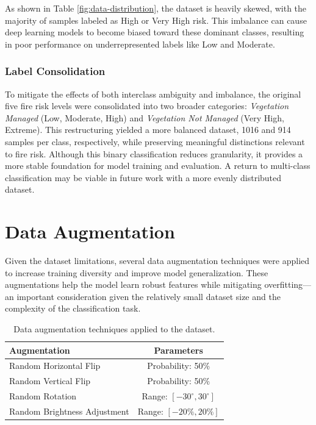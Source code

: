 As shown in Table \ref{fig:data-distribution}, the dataset is heavily skewed, 
with the majority of samples labeled as High or Very High risk. This imbalance 
can cause deep learning models to become biased toward these dominant classes, 
resulting in poor performance on underrepresented labels like Low and Moderate.

\subsubsection*{Label Consolidation}

To mitigate the effects of both interclass ambiguity and imbalance, the original 
five fire risk levels were consolidated into two broader categories: 
\textit{Vegetation Managed} (Low, Moderate, High) and \textit{Vegetation Not Managed} 
(Very High, Extreme). This restructuring yielded a more balanced dataset, 1016 and 
914 samples per class, respectively, while preserving meaningful distinctions 
relevant to fire risk. Although this binary classification reduces granularity, 
it provides a more stable foundation for model training and evaluation. A return 
to multi-class classification may be viable in future work with a more evenly 
distributed dataset.


\section{Data Augmentation}

Given the dataset limitations, several data augmentation techniques were applied to 
increase training diversity and improve model generalization. These augmentations help 
the model learn robust features while mitigating overfitting—an important consideration 
given the relatively small dataset size and the complexity of the classification task.

\begin{table}[ht]
    \centering
    \renewcommand{\arraystretch}{1.2}
    \setlength{\tabcolsep}{12pt}
    \begin{tabular}{lc}
        \toprule
        \textbf{Augmentation} & \textbf{Parameters} \\ 
        \midrule
        Random Horizontal Flip & Probability: 50\% \\ 
        Random Vertical Flip & Probability: 50\% \\ 
        Random Rotation  & Range: $[-30^{\circ},30^{\circ}]$ \\ 
        Random Brightness Adjustment & Range: $[-20\%,20\%]$ \\ 
        \bottomrule
    \end{tabular}
    \caption{Data augmentation techniques applied to the dataset.}
    \label{tab:augmentations}
\end{table}


